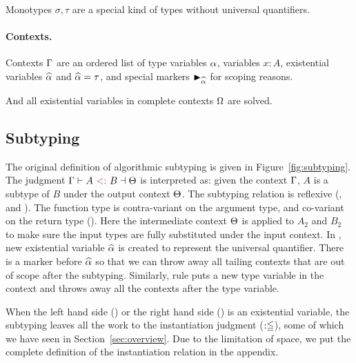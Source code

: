 Monotypes $\sigma, \tau$ are a special kind of types without universal
quantifiers.

\paragraph{Contexts.}
Contexts $\Gamma$ are an ordered list of type variables $\alpha$, variables $x:
A$, existential variables $\widehat{\alpha}$ and $\widehat{\alpha} = \tau$, and special markers
$\blacktriangleright_{\widehat{\alpha}}$ for scoping reasons.

And all existential variables in complete contexts $\Omega$ are solved.


\subsection{Subtyping}

\begin{figure*}[t]
  \caption{Algorithmic Subtyping (Original).}
  \label{fig:subtyping}
\end{figure*}

The original definition of algorithmic subtyping is given in
Figure~\ref{fig:subtyping}. The judgment $\tctx \bysub A \tsub B \toctx$ is
interpreted as: given the context $\Gamma$, $A$ is a subtype of $B$ under the
output context $\Theta$.
The subtyping relation is reflexive (,  and
). The function type is contra-variant on the argument type,
and co-variant on the return type (\rul{$\to$}). Here the intermediate context
$\Theta$ is applied to $A_2$ and $B_2$ to make sure the input types are fully
substituted under the input context. In , new existential
variable $\widehat{\alpha}$ is created to represent the universal quantifier. There is a
marker before $\widehat{\alpha}$ so that we can throw away all tailing contexts that are
out of scope after the subtyping. Similarly, rule  puts a
new type variable in the context and throws away all the contexts after the type variable.

When the left hand side () or the right hand side () is an
existential variable, the subtyping leaves all the work to the instantiation
judgment ($:\leqq$), some of which we have seen in Section~\ref{sec:overview}. Due
to the limitation of space, we put the complete definition of the instantiation
relation in the appendix.


